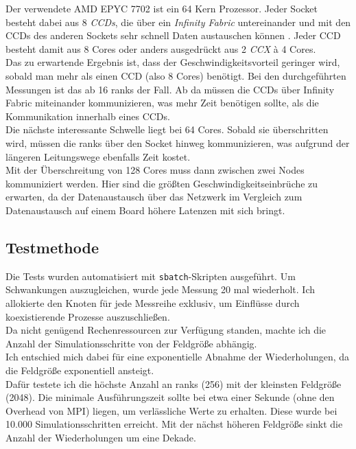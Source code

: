 \documentclass[german,plainarticle,hyperref,utf8]{zihpub}
\begin{document}
	Der verwendete AMD EPYC 7702 ist ein 64 Kern Prozessor. Jeder Socket besteht dabei aus 8 \textit{CCDs}, die über ein \textit{Infinity Fabric} untereinander und mit den CCDs des anderen Sockets sehr schnell Daten austauschen können \cite{amd}. Jeder CCD besteht damit aus 8 Cores oder anders ausgedrückt aus 2 \textit{CCX} à 4 Cores.\\
	
	Das zu erwartende Ergebnis ist, dass der Geschwindigkeitsvorteil geringer wird, sobald man mehr als einen CCD (also 8 Cores) benötigt. Bei den durchgeführten Messungen ist das ab 16 ranks der Fall. Ab da müssen die CCDs über Infinity Fabric miteinander kommunizieren, was mehr Zeit benötigen sollte, als die Kommunikation innerhalb eines CCDs.\\
	
	Die nächste interessante Schwelle liegt bei 64 Cores. Sobald sie überschritten wird, müssen die ranks über den Socket hinweg kommunizieren, was aufgrund der längeren Leitungswege ebenfalls Zeit kostet.\\
	
	Mit der Überschreitung von 128 Cores muss dann zwischen zwei Nodes kommuniziert werden. Hier sind die größten Geschwindigkeitseinbrüche zu erwarten, da der Datenaustausch über das Netzwerk im Vergleich zum Datenaustausch auf einem Board höhere Latenzen mit sich bringt.
	\subsection{Testmethode}
	Die Tests wurden automatisiert mit \texttt{sbatch}-Skripten ausgeführt. Um Schwankungen auszugleichen, wurde jede Messung 20 mal wiederholt. Ich allokierte den Knoten für jede Messreihe exklusiv, um Einflüsse durch koexistierende Prozesse auszuschließen.\\
	Da nicht genügend Rechenressourcen zur Verfügung standen, machte ich die Anzahl der Simulationsschritte von der Feldgröße abhängig.\\
	Ich entschied mich dabei für eine exponentielle Abnahme der Wiederholungen, da die Feldgröße exponentiell ansteigt.\\
	
	Dafür testete ich die höchste Anzahl an ranks (256) mit der kleinsten Feldgröße (2048). Die minimale Ausführungszeit sollte bei etwa einer Sekunde (ohne den Overhead von MPI) liegen, um verlässliche Werte zu erhalten. Diese wurde bei 10.000 Simulationsschritten erreicht. Mit der nächst höheren Feldgröße sinkt die Anzahl der Wiederholungen um eine Dekade.\\
	
\end{document}
